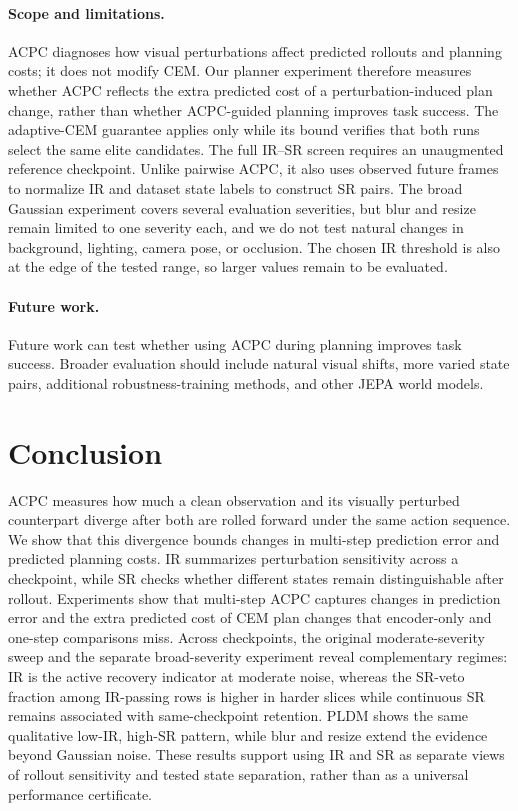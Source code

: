 \documentclass[10pt]{article}
\begin{document}
\paragraph{Scope and limitations.}
ACPC diagnoses how visual perturbations affect predicted rollouts and planning
costs; it does not modify CEM. Our planner experiment therefore measures
whether ACPC reflects the extra predicted cost of a perturbation-induced plan
change, rather than whether ACPC-guided planning improves task success. The
adaptive-CEM guarantee applies only while its bound verifies that both runs
select the same elite candidates. The full IR--SR screen requires an
unaugmented reference checkpoint. Unlike pairwise ACPC, it also uses observed
future frames to normalize IR and dataset state labels to construct SR pairs.
The broad Gaussian experiment covers several evaluation severities, but blur
and resize remain limited to one severity each, and we do not test natural
changes in background, lighting, camera pose, or occlusion. The chosen IR
threshold is also at the edge of the tested range, so larger values remain to
be evaluated.

\paragraph{Future work.}
Future work can test whether using ACPC during planning improves task success.
Broader evaluation should include natural visual shifts, more varied state
pairs, additional robustness-training methods, and other JEPA world models.

\section{Conclusion}\label{sec:conc}

ACPC measures how much a clean observation and its visually perturbed
counterpart diverge after both are rolled forward under the same action
sequence. We show that this divergence bounds changes in multi-step prediction
error and predicted planning costs. IR summarizes perturbation sensitivity
across a checkpoint, while SR checks whether different states remain
distinguishable after rollout. Experiments show that multi-step ACPC captures
changes in prediction error and the extra predicted cost of CEM plan changes
that encoder-only and one-step comparisons miss. Across checkpoints, the
original moderate-severity sweep and the separate broad-severity experiment
reveal complementary regimes: IR is the active recovery indicator at moderate
noise, whereas the SR-veto fraction among IR-passing rows is higher in harder
slices while continuous SR remains associated with same-checkpoint retention.
PLDM shows the same qualitative
low-IR, high-SR pattern, while blur and resize extend the evidence beyond
Gaussian noise. These results support using IR and SR as separate views of
rollout sensitivity and tested state separation, rather than as a universal
performance certificate.


\end{document}
